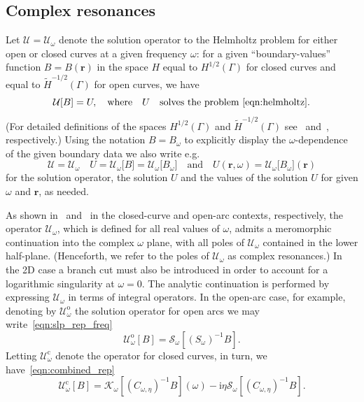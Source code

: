 \documentclass[11pt]{article}
\theoremstyle{plain}
\theoremstyle{remark}
\def \br{\mathbf{r}}
\def \inv{^{-1}}
\begin{document}
\subsection{Complex resonances}\label{sec:complex_resonances}
Let $\mathcal{U}=\mathcal{U}_\omega$ denote the solution operator to
the Helmholtz problem for either open or closed curves at a given
frequency $\omega$: for a given ``boundary-values'' function
$B = B(\mathbf{r})$ in the space $H$ equal to
$H^{1/2}(\Gamma)$ for closed curves and equal to
$\widetilde{H}^{-1/2}(\Gamma)$ for open curves, we have
\begin{equation}
  \label{eq:sol_op}
  \mathcal{U}[B] = U,\quad \mbox{where}\quad U\quad \mbox{solves the problem~\eqref{eqn:helmholtz}}.
\end{equation}
(For detailed definitions of the spaces $H^{1/2}(\Gamma)$ and
$\widetilde{H}^{-1/2}(\Gamma)$ see~\cite{mclean2000strongly}
and~\cite{stephan1984augmented,lintner2015generalized}, respectively.)
Using the notation $B=B_\omega$ to explicitly display the
$\omega$-dependence of the given boundary data we also write e.g.
\begin{equation}
  \label{eq:abuse}
  \mathcal{U}=\mathcal{U}_\omega\quad
  U= \mathcal{U}_\omega\big[B\big]=\mathcal{U}_\omega\big[B_\omega\big]\quad\mbox{and}\quad U(\br,\omega) = \mathcal{U_\omega}\big[B_\omega\big](\br)
\end{equation}
for the solution operator, the solution $U$ and the values of the
solution $U$ for given $\omega$ and $\br$, as needed.

As shown in~\cite{taylorbook} and~\cite{bst} in the closed-curve and
open-arc contexts, respectively, the operator $\mathcal{U}_\omega$,
which is defined for all real values of $\omega$, admits a meromorphic
continuation into the complex $\omega$ plane, with all poles of
$\mathcal{U}_\omega$ contained in the lower half-plane. (Henceforth, we refer to the
poles of $\mathcal{U}_\omega$ as complex resonances.) In the 2D case
a branch cut must also be introduced in order to account for a
logarithmic singularity at $\omega = 0$. The analytic
continuation is performed by expressing $\mathcal{U}_\omega$ in terms
of integral operators.  In the open-arc case, for example, denoting by
$\mathcal{U}^\mathrm{o}_\omega$ the solution operator for open arcs
we may write~\eqref{eqn:slp_rep_freq}
\begin{equation}\label{eqn:sol_op_oa}
    \mathcal{U}^\mathrm{o}_\omega[B] = \mathcal{S}_\omega[(S_\omega)\inv B].
\end{equation}
Letting $\mathcal{U}^\mathrm{c}_\omega$ denote the operator for closed
curves, in turn, we  have~\eqref{eqn:combined_rep}
\begin{equation}\label{eqn:sol_op_comb}
  \mathcal{U}^\mathrm{c}_\omega[B] =  \mathcal{K}_\omega[(C_{\omega,\eta})\inv B](\omega) - \mathrm{i}\eta \mathcal{S}_\omega[(C_{\omega,\eta})\inv B].
\end{equation}
\end{document}
